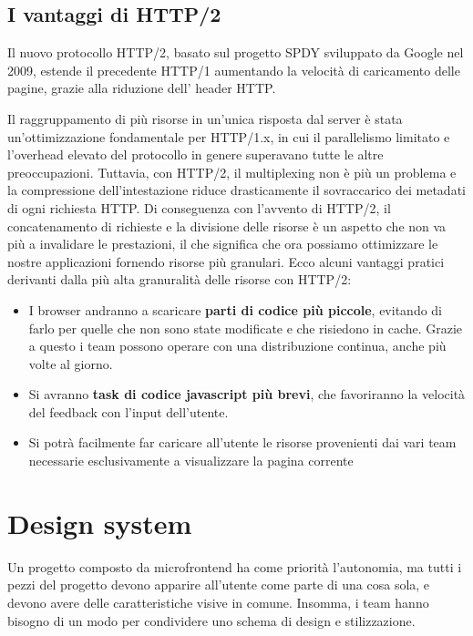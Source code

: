\subsection{I vantaggi di HTTP/2}
Il nuovo protocollo HTTP/2, basato sul progetto SPDY sviluppato da Google nel 2009, estende il precedente HTTP/1
aumentando la velocità di caricamento delle pagine, grazie alla riduzione dell' header HTTP.

Il raggruppamento di più risorse in un'unica risposta dal server è stata un'ottimizzazione fondamentale per HTTP/1.x, in cui 
il parallelismo limitato e l'overhead elevato del protocollo in genere superavano tutte le altre preoccupazioni.
Tuttavia, con HTTP/2, il multiplexing non è più un problema e la compressione dell'intestazione 
riduce drasticamente il sovraccarico dei metadati di ogni richiesta HTTP.\cite{http2}
 Di conseguenza con l'avvento di HTTP/2, il concatenamento di richieste e la divisione delle risorse è un aspetto che non 
 va più a invalidare le prestazioni, il che significa che ora possiamo ottimizzare le nostre applicazioni fornendo risorse 
 più granulari.
 Ecco alcuni vantaggi pratici derivanti dalla più alta granuralità delle risorse con HTTP/2:

 \begin{itemize}
     \item I browser andranno a scaricare \textbf{parti di codice più piccole}, evitando di farlo per quelle che non sono state modificate e che risiedono in cache. 
     Grazie a questo i team possono operare con una distribuzione continua, anche più volte al giorno.
     \item Si avranno \textbf{task di codice javascript più brevi}, che favoriranno la velocità del feedback con l'input dell'utente.
     \item Si potrà facilmente far caricare all'utente le risorse provenienti dai vari team necessarie esclusivamente a visualizzare la pagina corrente
 \end{itemize}




 \section{Design system}

 Un progetto composto da microfrontend ha come priorità l’autonomia, ma tutti i pezzi del progetto devono apparire 
 all’utente come parte di una cosa sola, e devono avere delle caratteristiche visive in comune. Insomma, i team hanno 
 bisogno di un modo per condividere uno schema di design e stilizzazione.


